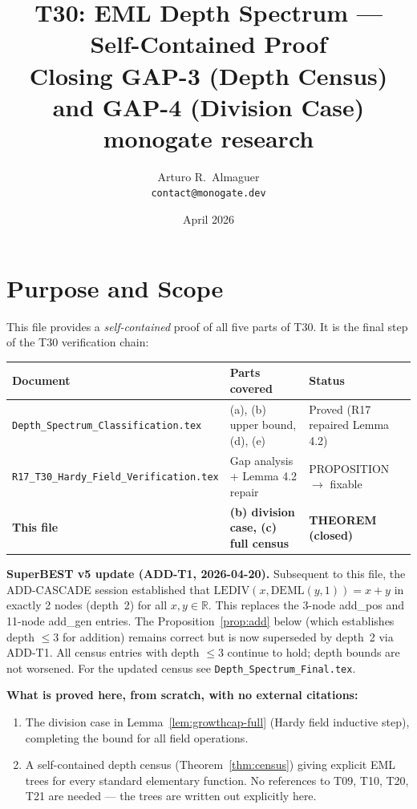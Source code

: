 \documentclass[12pt,a4paper]{article}
\title{T30: EML Depth Spectrum --- Self-Contained Proof\\
       \large Closing GAP-3 (Depth Census) and GAP-4 (Division Case)\\
       \normalsize monogate research}
\author{Arturo R.\ Almaguer\\
\small \texttt{contact@monogate.dev}}
\date{April 2026}
\theoremstyle{definition}
\theoremstyle{remark}
\begin{document}
\maketitle
\tableofcontents

\section{Purpose and Scope}

This file provides a \emph{self-contained} proof of all five parts of T30.
It is the final step of the T30 verification chain:

\begin{center}
\begin{tabular}{@{}lll@{}}
\toprule
\textbf{Document} & \textbf{Parts covered} & \textbf{Status} \\
\midrule
\texttt{Depth\_Spectrum\_Classification.tex}
  & (a), (b) upper bound, (d), (e)
  & Proved (R17 repaired Lemma 4.2) \\
\texttt{R17\_T30\_Hardy\_Field\_Verification.tex}
  & Gap analysis + Lemma 4.2 repair
  & PROPOSITION $\to$ fixable \\
\textbf{This file}
  & \textbf{(b) division case, (c) full census}
  & \textbf{THEOREM (closed)} \\
\bottomrule
\end{tabular}
\end{center}

\noindent\textbf{SuperBEST v5 update (ADD-T1, 2026-04-20).}
Subsequent to this file, the ADD-CASCADE session established that
$\mathrm{LEDIV}(x,\mathrm{DEML}(y,1)) = x + y$ in exactly 2 nodes (depth~2) for all
$x, y \in \mathbb{R}$.  This replaces the 3-node add\_pos and 11-node add\_gen entries.
The Proposition~\ref{prop:add} below (which establishes depth $\leq 3$ for addition)
remains correct but is now superseded by depth~2 via ADD-T1.
All census entries with depth $\leq 3$ continue to hold; depth bounds are not worsened.
For the updated census see \texttt{Depth\_Spectrum\_Final.tex}.

\medskip
\noindent\textbf{What is proved here, from scratch, with no external citations:}
\begin{enumerate}
  \item[\textbf{GAP-4}] The division case in Lemma~\ref{lem:growthcap-full}
        (Hardy field inductive step), completing the bound for all field operations.
  \item[\textbf{GAP-3}] A self-contained depth census (Theorem~\ref{thm:census})
        giving explicit EML trees for every standard elementary function.
        No references to T09, T10, T20, T21 are needed --- the trees are written
        out explicitly here.
\end{enumerate}
\end{document}

